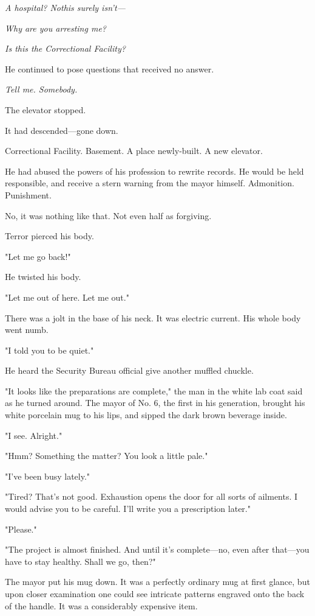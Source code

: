 \emph{A hospital? No\el this surely isn't---}

\emph{Why are you arresting me?}

\emph{Is this the Correctional Facility?}

He continued to pose questions that received no answer.

\emph{Tell me. Somebody.}

The elevator stopped.

It had descended---gone down.

Correctional Facility. Basement. A place newly-built. A new elevator.

He had abused the powers of his profession to rewrite records. He would
be held responsible, and receive a stern warning from the mayor himself.
Admonition. Punishment.

No, it was nothing like that. Not even half as forgiving.

Terror pierced his body.

"Let me go back!"

He twisted his body.

"Let me out of here. Let me out."

There was a jolt in the base of his neck. It was electric current. His
whole body went numb.

"I told you to be quiet."

He heard the Security Bureau official give another muffled chuckle.

\mybreak

"It looks like the preparations are complete," the man in the white lab
coat said as he turned around. The mayor of No. 6, the first in his
generation, brought his white porcelain mug to his lips, and sipped the
dark brown beverage inside.

"I see. Alright."

"Hmm? Something the matter? You look a little pale."

"I've been busy lately."

"Tired? That's not good. Exhaustion opens the door for all sorts of
ailments. I would advise you to be careful. I'll write you a
prescription later."

"Please."

"The project is almost finished. And until it's complete---no, even after
that---you have to stay healthy. Shall we go, then?"

The mayor put his mug down. It was a perfectly ordinary mug at first
glance, but upon closer examination one could see intricate patterns
engraved onto the back of the handle. It was a considerably expensive
item.

